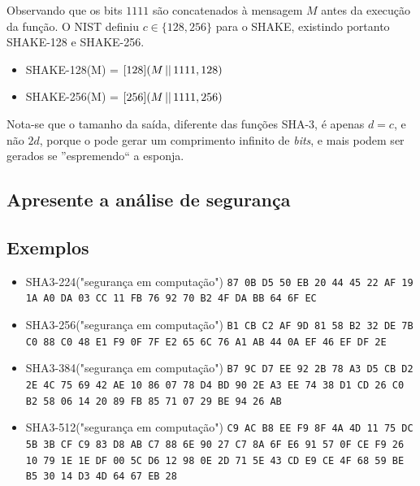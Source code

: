 \begin{enumerate}[label=\roman*.]
        Observando que os bits $1111$ são concatenados à mensagem $M$ antes da
        execução da função. O NIST definiu $c \in \{128, 256\}$ para o SHAKE,
        existindo portanto SHAKE-128 e SHAKE-256.

        \begin{itemize}
            \setlength\itemsep{0.2em}
            \item SHAKE-128(M) = \Keccak$[128](M \operatorname{\lvert\rvert} 1111, 128)$
            \item SHAKE-256(M) = \Keccak$[256](M \operatorname{\lvert\rvert} 1111, 256)$
        \end{itemize}

        Nota-se que o tamanho da saída, diferente das funções SHA-3, é apenas
        $d = c$, e não $2d$, porque o \Keccak{} pode gerar um comprimento
        infinito de \textit{bits}, e mais podem ser gerados se ''espremendo``
        a esponja.
\end{enumerate}

\subsection{Apresente a análise de segurança}

\subsection{Exemplos}

\begin{itemize}
    \item SHA3-224("segurança em computação") \newline
        \texttt{87 0B D5 50 EB 20 44 45 22 AF 19 1A A0 DA 03 CC 11 FB 76 92 70 B2 4F DA BB 64 6F EC} \newline
    \item SHA3-256("segurança em computação") \newline
        \texttt{B1 CB C2 AF 9D 81 58 B2 32 DE 7B C0 88 C0 48 E1 F9 0F 7F E2 65 6C 76 A1 AB 44 0A EF 46 EF DF 2E} \newline
    \item SHA3-384("segurança em computação") \newline
        \texttt{B7 9C D7 EE 92 2B 78 A3 D5 CB D2 2E 4C 75 69 42 AE 10 86 07 78 D4 BD 90 2E A3 EE 74 38 D1 CD 26 C0 B2 58 06 14 20 89 FB 85 71 07 29 BE 94 26 AB} \newline
    \item SHA3-512("segurança em computação") \newline
        \texttt{C9 AC B8 EE F9 8F 4A 4D 11 75 DC 5B 3B CF C9 83 D8 AB C7 88 6E 90 27 C7 8A 6F E6 91 57 0F CE F9 26 10 79 1E 1E DF 00 5C D6 12 98 0E 2D 71 5E 43 CD E9 CE 4F 68 59 BE B5 30 14 D3 4D 64 67 EB 28}
\end{itemize}

\let\thesubsection\oldsubsection%
